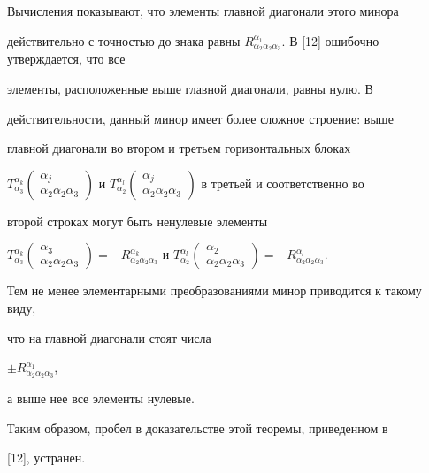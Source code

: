 \begin{pf}
Вычисления показывают, что элементы главной диагонали этого минора


действительно с точностью до знака равны $R^{\alpha_1}_{\alpha_2


\alpha_2 \alpha_3} $. В [12] ошибочно утверждается, что все


элементы, расположенные выше главной диагонали, равны нулю. В


действительности, данный минор имеет более сложное строение: выше


главной диагонали во втором и третьем горизонтальных блоках


$T^{\alpha_k}_{\alpha_3} \left(\begin{smallmatrix}\alpha_j\\ \alpha_2


\alpha_2 \alpha_3\end{smallmatrix}\right)$ и $T^{\alpha_l}_{\alpha_2}


\left(\begin{smallmatrix}\alpha_j\\ \alpha_2 \alpha_2


\alpha_3\end{smallmatrix}\right) $ в третьей и соответственно во


второй строках могут быть ненулевые элементы


$T^{\alpha_k}_{\alpha_3} \left(\begin{smallmatrix}\alpha_3\\ \alpha_2


\alpha_2 \alpha_3\end{smallmatrix}\right) =-R^{\alpha_k}_{\alpha_2


\alpha_2 \alpha_3}$ и $T^{\alpha_l}_{\alpha_2}


\left(\begin{smallmatrix}\alpha_2\\ \alpha_2 \alpha_2


\alpha_3\end{smallmatrix}\right) =-R^{\alpha_l}_{\alpha_2 \alpha_2


\alpha_3} $.


Тем не менее элементарными преобразованиями минор приводится к такому виду,


что на главной диагонали стоят числа


$\pm R^{\alpha_1}_{\alpha_2 \alpha_2 \alpha_3} $,


а выше нее все элементы нулевые.





Таким образом, пробел в доказательстве этой теоремы, приведенном в


[12], устранен.


\end{pf}





